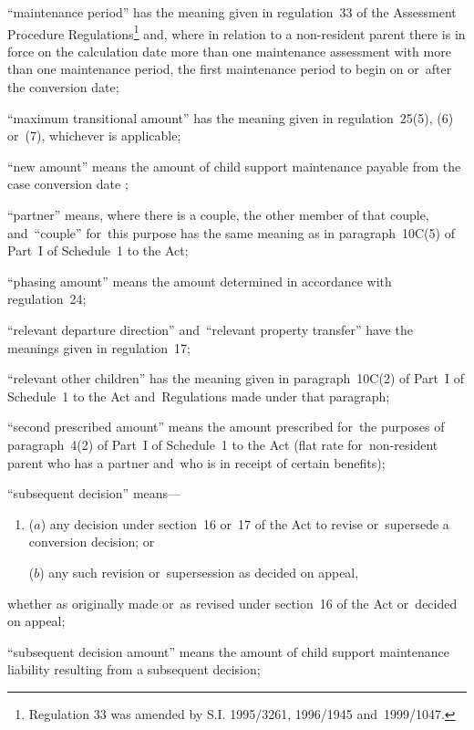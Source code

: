 \documentclass[12pt,a4paper]{article}
\begin{document}
\begin{enumerate}
“maintenance period” has the meaning given in regulation~33 of the Assessment Procedure Regulations\footnote{\frenchspacing Regulation 33 was amended by S.I. 1995/3261, 1996/1945 and~1999/1047.} and, where in relation to a non-resident parent there is in force on the calculation date more than one maintenance assessment with more than one maintenance period, the first maintenance period to begin on or~after the conversion date;

“maximum transitional amount” 
has the meaning given in regulation~25(5), (6) or~(7), whichever is applicable;  %

“new amount” means the amount of child support maintenance payable 
from the case conversion date%
;

“partner” means, where there is a couple, the other member of that couple, and~“couple” for~this purpose has the same meaning as in paragraph~10C(5) of Part~I of Schedule~1 to the Act;

“phasing amount” means the amount determined in accordance with regulation~24;

“relevant departure direction” and~“relevant property transfer” have the meanings given in regulation~17;

“relevant other children” has the meaning given in paragraph~10C(2) of Part~I of Schedule~1 to the Act and~Regulations made under that paragraph;

“second prescribed amount” means the amount prescribed for~the purposes of paragraph~4(2) of Part~I of Schedule~1 to the Act (flat rate for~non-resident parent who has a partner and~who is in receipt of certain benefits);

“subsequent decision” means—
\begin{enumerate}\item[]
($a$) 
any decision under section~16 or~17 of the Act to revise or~supersede a conversion decision; or

($b$) 
any such revision or~supersession as decided on appeal,
\end{enumerate}
whether as originally made or~as revised under section~16 of the Act or~decided on appeal;

“subsequent decision amount” means the amount of child support maintenance liability resulting from a subsequent decision;


\end{enumerate}
\end{document}
